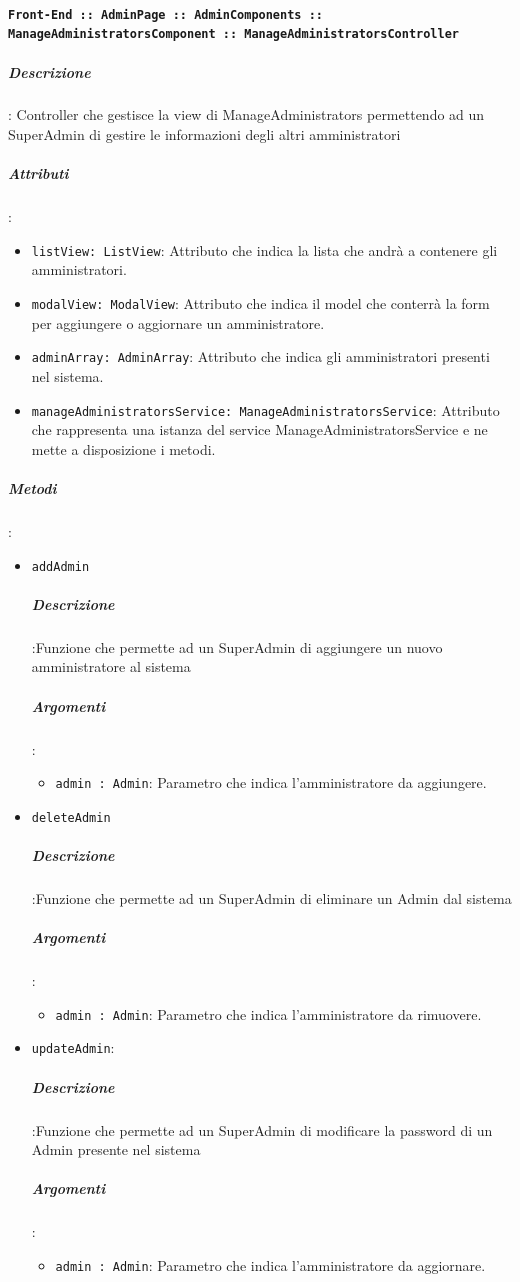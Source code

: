 \documentclass[../DefinizioneDiProdotto_v3.0.0.tex]{subfiles}
\begin{document}
				\paragraph{\texttt{Front-End :: AdminPage :: AdminComponents :: ManageAdministratorsComponent :: ManageAdministratorsController}}
		      		\subparagraph{Descrizione}: Controller che gestisce la view di ManageAdministrators permettendo ad un SuperAdmin di gestire le informazioni degli altri amministratori
			      	\subparagraph{Attributi}:
					\begin{itemize}
						\item \texttt{listView: ListView}: Attributo che indica la lista che andrà a contenere gli amministratori.
						\item \texttt{modalView: ModalView}: Attributo che indica il model che conterrà la form per aggiungere o aggiornare un amministratore.
						\item \texttt{adminArray: AdminArray}: Attributo che indica gli amministratori presenti nel sistema.
						\item \texttt{manageAdministratorsService: ManageAdministratorsService}: Attributo che rappresenta una istanza del service ManageAdministratorsService e ne mette a disposizione i metodi.
					\end{itemize}
			      	\subparagraph{Metodi}:
					\begin{itemize}
						\item \texttt{addAdmin}
						\subparagraph{Descrizione}:Funzione che permette ad un SuperAdmin di aggiungere un nuovo amministratore al sistema
						\subparagraph{Argomenti}:
						\begin{itemize}
							\item \texttt{admin : Admin}: Parametro che indica l'amministratore da aggiungere.
						\end{itemize}

						\item \texttt{deleteAdmin}
						\subparagraph{Descrizione}:Funzione che permette ad un SuperAdmin di eliminare un Admin dal sistema
						\subparagraph{Argomenti}:
						\begin{itemize}
							\item \texttt{admin : Admin}: Parametro che indica l'amministratore da rimuovere.
						\end{itemize}
						\item \texttt{updateAdmin}:
						\subparagraph{Descrizione}:Funzione che permette ad un SuperAdmin di modificare la password di un Admin presente nel sistema
						\subparagraph{Argomenti}:
						\begin{itemize}
							\item \texttt{admin : Admin}: Parametro che indica l'amministratore da aggiornare.
						\end{itemize}
					\end{itemize}
\end{document}
